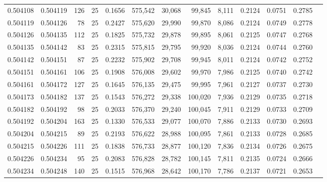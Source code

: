 \begin{tabular}{rrrrrrrrrrrrr}
0.504108 & 0.504119 & 126 &  25 &                                     0.1656 & 575,542 &  30,068 &  99,845 &   8,111 & 0.2124 & 0.0751 & 0.2785 \\
0.504119 & 0.504126 &  78 &  25 &                                     0.2427 & 575,620 &  29,990 &  99,870 &   8,086 & 0.2124 & 0.0749 & 0.2778 \\
0.504126 & 0.504135 & 112 &  25 &                                     0.1825 & 575,732 &  29,878 &  99,895 &   8,061 & 0.2125 & 0.0747 & 0.2768 \\
0.504135 & 0.504142 &  83 &  25 &                                     0.2315 & 575,815 &  29,795 &  99,920 &   8,036 & 0.2124 & 0.0744 & 0.2760 \\
0.504142 & 0.504151 &  87 &  25 &                                     0.2232 & 575,902 &  29,708 &  99,945 &   8,011 & 0.2124 & 0.0742 & 0.2752 \\
0.504151 & 0.504161 & 106 &  25 &                                     0.1908 & 576,008 &  29,602 &  99,970 &   7,986 & 0.2125 & 0.0740 & 0.2742 \\
0.504161 & 0.504172 & 127 &  25 &                                     0.1645 & 576,135 &  29,475 &  99,995 &   7,961 & 0.2127 & 0.0737 & 0.2730 \\
0.504173 & 0.504182 & 137 &  25 &                                     0.1543 & 576,272 &  29,338 & 100,020 &   7,936 & 0.2129 & 0.0735 & 0.2718 \\
0.504182 & 0.504192 &  98 &  25 &                                     0.2033 & 576,370 &  29,240 & 100,045 &   7,911 & 0.2129 & 0.0733 & 0.2709 \\
0.504192 & 0.504204 & 163 &  25 &                                     0.1330 & 576,533 &  29,077 & 100,070 &   7,886 & 0.2133 & 0.0730 & 0.2693 \\
0.504204 & 0.504215 &  89 &  25 &                                     0.2193 & 576,622 &  28,988 & 100,095 &   7,861 & 0.2133 & 0.0728 & 0.2685 \\
0.504215 & 0.504226 & 111 &  25 &                                     0.1838 & 576,733 &  28,877 & 100,120 &   7,836 & 0.2134 & 0.0726 & 0.2675 \\
0.504226 & 0.504234 &  95 &  25 &                                     0.2083 & 576,828 &  28,782 & 100,145 &   7,811 & 0.2135 & 0.0724 & 0.2666 \\
0.504234 & 0.504248 & 140 &  25 &                                     0.1515 & 576,968 &  28,642 & 100,170 &   7,786 & 0.2137 & 0.0721 & 0.2653 \\

\end{tabular}
